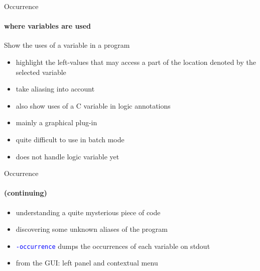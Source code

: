\documentclass{beamer}
\newcommand{\orange}[1]{{\textcolor{frama-c-1}{#1}}}
\newcommand{\vvert}[1]{{\textcolor{vert}{#1}}}
\newcommand{\bleu}[1]{{\textcolor{blue}{#1}}}
\newcommand{\goup}{\vspace{-5pt}}
\newcommand{\code}[1]{\bleu{\texttt{#1}}}
\newcommand{\continuing}{\framesubtitle{(continuing)}}
\newcommand{\intro}[1]{\begin{center}\vvert{#1}\end{center}}
\newenvironment{sect}[1]{\orange{#1}\begin{itemize}}{\end{itemize}}
\newenvironment{features}{\begin{sect}{Features}}{\end{sect}}
\newenvironment{warnings}{\begin{sect}{Warnings}}{\end{sect}}
\newenvironment{whatitisgoodfor}{\begin{sect}{What is it good for}}{\end{sect}}
\newenvironment{howtouse}{\begin{sect}{How to use}}{\end{sect}}
\newenvironment{precise}{\begin{sect}{More precisely}}{\end{sect}}
\begin{document}

\begin{frame}{Occurrence}
\framesubtitle{where variables are used}

\goup
\intro{Show the uses of a variable in a program}
\goup

\begin{precise}
\item highlight the left-values that may access a part of the location
  denoted by the selected variable
\end{precise}\smallskip

\begin{features}
\item take aliasing into account
\item also show uses of a C variable in logic annotations
\item mainly a graphical plug-in
\end{features}\smallskip

\begin{warnings}
\item quite difficult to use in batch mode
\item does not handle logic variable yet
\end{warnings}

\end{frame}


\begin{frame}{Occurrence}
\continuing

\begin{whatitisgoodfor}
\item understanding a quite mysterious piece of code
\item discovering some unknown aliases of the program
\end{whatitisgoodfor}\medskip

\begin{howtouse}
\item \code{-occurrence} dumps the occurrences of each variable on
  stdout
\item from the GUI: left panel and contextual menu
\end{howtouse}

\end{frame}

\end{document}
